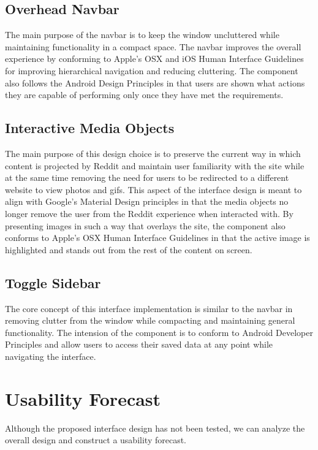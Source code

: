 \documentclass{article}
\begin{document}
\subsection{Overhead Navbar} The main purpose of the navbar is to keep the window uncluttered while maintaining functionality in a compact space. The navbar improves the overall experience by conforming to Apple's OSX and iOS Human Interface Guidelines for improving hierarchical navigation and reducing cluttering\cite{OSX, iOS}. The component also follows the Android Design Principles in that users are shown what actions they are capable of performing only once they have met the requirements\cite{Android}.

\subsection{Interactive Media Objects} The main purpose of this design choice is to preserve the current way in which content is projected by Reddit and maintain user familiarity with the site while at the same time removing the need for users to be redirected to a different website to view photos and gifs. This aspect of the interface design is meant to align with Google's Material Design principles in that the media objects no longer remove the user from the Reddit experience when interacted with\cite{Google}. By presenting images in such a way that overlays the site, the component also conforms to Apple's OSX Human Interface Guidelines in that the active image is highlighted and stands out from the rest of the content on screen\cite{OSX}.

\subsection{Toggle Sidebar} The core concept of this interface implementation is similar to the navbar in removing clutter from the window while compacting and maintaining general functionality. The intension of the component is to conform to Android Developer Principles and allow users to access their saved data at any point while navigating the interface\cite{Android}.

\section{Usability Forecast} Although the proposed interface design has not been tested, we can analyze the overall design and construct a usability forecast.
\end{document}
